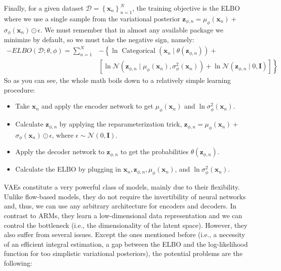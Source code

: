 \documentclass{article}
\begin{document}
\begin{appendix}
{Finally, for a given dataset $\mathcal{D}=\left\{\mathbf{x}_{n}\right\}_{n=1}^{N}$, the training objective is the ELBO where we use a single sample from the variational posterior $\mathbf{z}_{\phi, n}=\mu_{\phi}\left(\mathbf{x}_{n}\right)+$ $\sigma_{\phi}\left(\mathbf{x}_{n}\right) \odot \epsilon$. We must remember that in almost any available package we minimize by default, so we must take the negative sign, namely:
$$
\begin{aligned}
-E L B O(\mathcal{D} ; \theta, \phi)=\sum_{n=1}^{N} &-\left\{\ln \text { Categorical }\left(\mathbf{x}_{n} \mid \theta\left(\mathbf{z}_{\phi, n}\right)\right)+\right.\\
& {\left.\left[\ln \mathcal{N}\left(\mathbf{z}_{\phi, n} \mid \mu_{\phi}\left(\mathbf{x}_{n}\right), \sigma_{\phi}^{2}\left(\mathbf{x}_{n}\right)\right)+\ln \mathcal{N}\left(\mathbf{z}_{\phi, n} \mid 0, \mathbf{I}\right)\right]\right\} }
\end{aligned}
$$
So as you can see, the whole math boils down to a relatively simple learning procedure:
\begin{itemize}
    \item Take $\mathbf{x}_{n}$ and apply the encoder network to get $\mu_{\phi}\left(\mathbf{x}_{n}\right)$ and $\ln \sigma_{\phi}^{2}\left(\mathbf{x}_{n}\right)$.
    \item Calculate $\mathbf{z}_{\phi, n}$ by applying the reparameterization trick, $\mathbf{z}_{\phi, n}=\mu_{\phi}\left(\mathbf{x}_{n}\right)+$ $\sigma_{\phi}\left(\mathbf{x}_{n}\right) \odot \epsilon$, where $\epsilon \sim \mathcal{N}(0, \mathbf{I})$.
    \item Apply the decoder network to $\mathbf{z}_{\phi, n}$ to get the probabilities $\theta\left(\mathbf{z}_{\phi, n}\right)$.
    \item Calculate the ELBO by plugging in $\mathbf{x}_{n}, \mathbf{z}_{\phi, n}, \mu_{\phi}\left(\mathbf{x}_{n}\right)$, and $\ln \sigma_{\phi}^{2}\left(\mathbf{x}_{n}\right)$.
\end{itemize}

VAEs constitute a very powerful class of models, mainly due to their flexibility. Unlike flow-based models, they do not require the invertibility of neural networks and, thus, we can use any arbitrary architecture for encoders and decoders. In contrast to ARMs, they learn a low-dimensional data representation and we can control the bottleneck (i.e., the dimensionality of the latent space). However, they also suffer from several issues. Except the ones mentioned before (i.e., a necessity of an efficient integral estimation, a gap between the ELBO and the log-likelihood function for too simplistic variational posteriors), the potential problems are the following:

}
\end{appendix}
\end{document}
